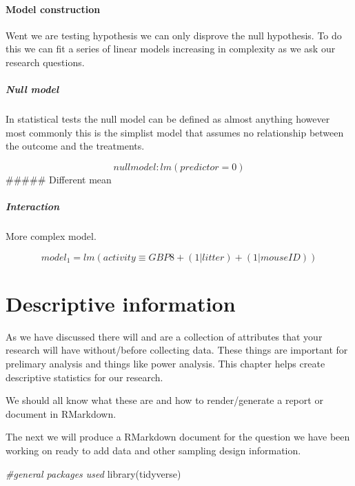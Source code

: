 \documentclass[
]{book}
\newenvironment{Shaded}{\begin{snugshade}}{\end{snugshade}}
\newcommand{\CommentTok}[1]{\textcolor[rgb]{0.56,0.35,0.01}{\textit{#1}}}
\newcommand{\FunctionTok}[1]{\textcolor[rgb]{0.00,0.00,0.00}{#1}}
\newcommand{\NormalTok}[1]{#1}
\begin{document}
\hypertarget{model-construction}{%
\subsubsection{Model construction}\label{model-construction}}

Went we are testing hypothesis we can only disprove the null hypothesis. To do this we can fit a series of linear models increasing in complexity as we ask our research questions.

\hypertarget{null-model}{%
\paragraph{Null model}\label{null-model}}

In statistical tests the null model can be defined as almost anything however most commonly this is the simplist model that assumes no relationship between the outcome and the treatments.

\[ null model: lm(predictor = 0) \]
\#\#\#\#\# Different mean

\hypertarget{interaction}{%
\paragraph{Interaction}\label{interaction}}

More complex model.

\[ model_1 = lm(activity \equiv GBP8 + (1|litter) + (1|mouseID)) \]

\hypertarget{descriptive-information}{%
\chapter{Descriptive information}\label{descriptive-information}}

As we have discussed there will and are a collection of attributes that your research will have without/before collecting data. These things are important for prelimary analysis and things like power analysis. This chapter helps create descriptive statistics for our research.

We should all know what these are and how to render/generate a report or document in RMarkdown.

The next we will produce a RMarkdown document for the question we have been working on ready to add data and other sampling design information.

\begin{Shaded}
\begin{Highlighting}[]
\CommentTok{\#general packages used}
\FunctionTok{library}\NormalTok{(tidyverse)}
\end{Highlighting}
\end{Shaded}
\end{document}
